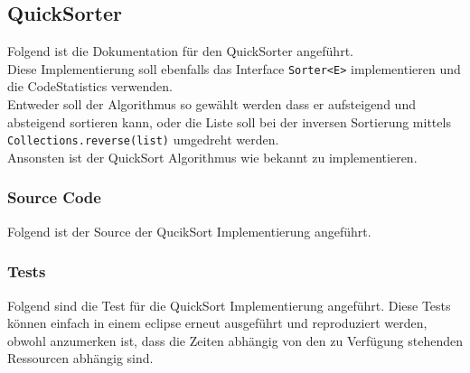 \documentclass[11pt, a4paper, twoside]{article}   	%
\newcommand{\srcDir}{../src/main/java}
\newcommand{\mainPackage}{\srcDir/at/fhooe/swe4/lab3}
\newcommand{\testSection}{Tests}
\newcommand{\inlinecode}{\lstinline[style=inlineSource]}
\begin{document}
\subsection{QuickSorter}
Folgend ist die Dokumentation für den QuickSorter angeführt.\\
Diese Implementierung soll ebenfalls das Interface \inlinecode{Sorter<E>} implementieren und die CodeStatistics verwenden.\\
Entweder soll der Algorithmus so gewählt werden dass er aufsteigend und absteigend sortieren kann, oder die  Liste soll bei der inversen Sortierung mittels \inlinecode{Collections.reverse(list)} umgedreht werden.\\
Ansonsten ist der QuickSort Algorithmus wie bekannt zu implementieren.
\subsubsection{Source Code}
Folgend ist der Source der QucikSort Implementierung angeführt.

\newpage
\subsubsection{\testSection}
Folgend sind die Test für die QuickSort Implementierung angeführt.
Diese Tests können einfach in einem eclipse erneut ausgeführt und reproduziert werden, obwohl anzumerken ist, dass die Zeiten abhängig von den zu Verfügung stehenden Ressourcen abhängig sind.
\end{document}
